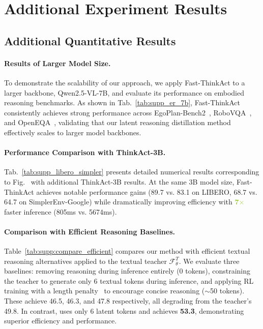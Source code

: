 \section{Additional Experiment Results}

\subsection{Additional Quantitative Results}



\paragraph{Results of Larger Model Size.} To demonstrate the scalability of our approach, we apply Fast-ThinkAct to a larger backbone, Qwen2.5-VL-7B, and evaluate its performance on embodied reasoning benchmarks. As shown in Tab.~\ref{tab:supp_er_7b}, Fast-ThinkAct consistently achieves strong performance across EgoPlan-Bench2~\cite{qiu2024egoplan2}, RoboVQA~\cite{sermanet2024robovqa}, and OpenEQA~\cite{majumdar2024openeqa}, validating that our latent reasoning distillation method effectively scales to larger model backbones.

\paragraph{Performance Comparison with ThinkAct-3B.} Tab.~\ref{tab:supp_libero_simpler} presents detailed numerical results corresponding to Fig.~ with additional ThinkAct-3B results. At the same 3B model size, Fast-ThinkAct achieves notable performance gains (89.7 vs. 83.1 on LIBERO, 68.7 vs. 64.7 on SimplerEnv-Google) while dramatically improving efficiency with \textbf{\textcolor{YellowGreen}{7$\times$}} faster inference (805ms vs. 5674ms).

\paragraph{Comparison with Efficient Reasoning Baselines.} Table~\ref{tab:supp:compare_efficient} compares our method with efficient textual reasoning alternatives applied to the textual teacher $\mathcal{F}_\theta^T$. We evaluate three baselines: removing reasoning during inference entirely (0 tokens), constraining the teacher to generate only 6 textual tokens during inference, and applying RL training with a length penalty~\cite{arora2025training} to encourage concise reasoning ($\sim$50 tokens). These achieve 46.5, 46.3, and 47.8 respectively, all degrading from the teacher's 49.8. In contrast, \ours{} uses only 6 latent tokens and achieves \textbf{53.3}, demonstrating superior efficiency and performance.


